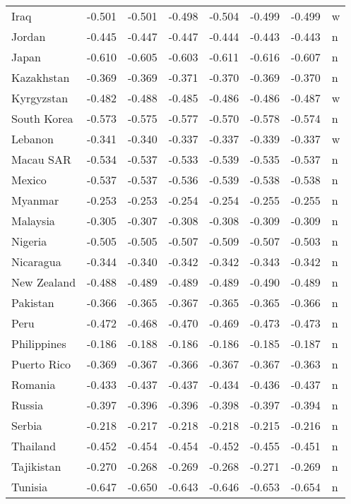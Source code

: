 \documentclass{amsart}
\begin{document}
\begin{longtable}{lrrrrrrl}
  Iraq & -0.501 & -0.501 & -0.498 & -0.504 & -0.499 & -0.499 & w \\ 
  Jordan & -0.445 & -0.447 & -0.447 & -0.444 & -0.443 & -0.443 & n \\ 
  Japan & -0.610 & -0.605 & -0.603 & -0.611 & -0.616 & -0.607 & n \\ 
  Kazakhstan & -0.369 & -0.369 & -0.371 & -0.370 & -0.369 & -0.370 & n \\ 
  Kyrgyzstan & -0.482 & -0.488 & -0.485 & -0.486 & -0.486 & -0.487 & w \\ 
  South Korea & -0.573 & -0.575 & -0.577 & -0.570 & -0.578 & -0.574 & n \\ 
  Lebanon & -0.341 & -0.340 & -0.337 & -0.337 & -0.339 & -0.337 & w \\ 
  Macau SAR & -0.534 & -0.537 & -0.533 & -0.539 & -0.535 & -0.537 & n \\ 
  Mexico & -0.537 & -0.537 & -0.536 & -0.539 & -0.538 & -0.538 & n \\ 
  Myanmar & -0.253 & -0.253 & -0.254 & -0.254 & -0.255 & -0.255 & n \\ 
  Malaysia & -0.305 & -0.307 & -0.308 & -0.308 & -0.309 & -0.309 & n \\ 
  Nigeria & -0.505 & -0.505 & -0.507 & -0.509 & -0.507 & -0.503 & n \\ 
  Nicaragua & -0.344 & -0.340 & -0.342 & -0.342 & -0.343 & -0.342 & n \\ 
  New Zealand & -0.488 & -0.489 & -0.489 & -0.489 & -0.490 & -0.489 & n \\ 
  Pakistan & -0.366 & -0.365 & -0.367 & -0.365 & -0.365 & -0.366 & n \\ 
  Peru & -0.472 & -0.468 & -0.470 & -0.469 & -0.473 & -0.473 & n \\ 
  Philippines & -0.186 & -0.188 & -0.186 & -0.186 & -0.185 & -0.187 & n \\ 
  Puerto Rico & -0.369 & -0.367 & -0.366 & -0.367 & -0.367 & -0.363 & n \\ 
  Romania & -0.433 & -0.437 & -0.437 & -0.434 & -0.436 & -0.437 & n \\ 
  Russia & -0.397 & -0.396 & -0.396 & -0.398 & -0.397 & -0.394 & n \\ 
  Serbia & -0.218 & -0.217 & -0.218 & -0.218 & -0.215 & -0.216 & n \\ 
  Thailand & -0.452 & -0.454 & -0.454 & -0.452 & -0.455 & -0.451 & n \\ 
  Tajikistan & -0.270 & -0.268 & -0.269 & -0.268 & -0.271 & -0.269 & n \\ 
  Tunisia & -0.647 & -0.650 & -0.643 & -0.646 & -0.653 & -0.654 & n \\ 

\end{longtable}
\end{document}
